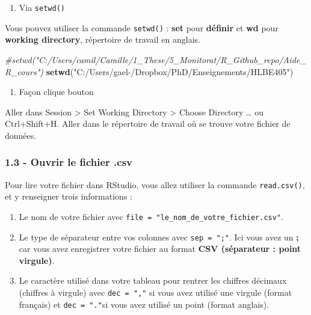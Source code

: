\documentclass[
]{article}
\newenvironment{Shaded}{\begin{snugshade}}{\end{snugshade}}
\newcommand{\CommentTok}[1]{\textcolor[rgb]{0.56,0.35,0.01}{\textit{#1}}}
\newcommand{\KeywordTok}[1]{\textcolor[rgb]{0.13,0.29,0.53}{\textbf{#1}}}
\newcommand{\NormalTok}[1]{#1}
\newcommand{\StringTok}[1]{\textcolor[rgb]{0.31,0.60,0.02}{#1}}
\providecommand{\tightlist}{%
  \setlength{\itemsep}{0pt}\setlength{\parskip}{0pt}}
\begin{document}
\begin{enumerate}
\def\labelenumi{\arabic{enumi}.}
\tightlist
\item
  Via \texttt{setwd()}
\end{enumerate}

Vous pouvez utiliser la commande \texttt{setwd()} : \textbf{set} pour
\textbf{définir} et \textbf{wd} pour \textbf{working directory},
répertoire de travail en anglais.

\begin{Shaded}
\begin{Highlighting}[]
\CommentTok{#setwd("C:/Users/camil/Camille/1_These/5_Monitorat/R_Github_repo/Aide_R_cours")}
\KeywordTok{setwd}\NormalTok{(}\StringTok{"C:/Users/gael-/Dropbox/PhD/Enseignements/HLBE405"}\NormalTok{)}
\end{Highlighting}
\end{Shaded}

\begin{enumerate}
\def\labelenumi{\arabic{enumi}.}
\setcounter{enumi}{1}
\tightlist
\item
  Façon clique bouton
\end{enumerate}

Aller dans Session \textgreater{} Set Working Directory \textgreater{}
Choose Directory \ldots{} ou Ctrl+Shift+H. Aller dans le répertoire de
travail où se trouve votre fichier de données.

\hypertarget{ouvrir-le-fichier-.csv}{%
\subsubsection{1.3 - Ouvrir le fichier
.csv}\label{ouvrir-le-fichier-.csv}}

Pour lire votre fichier dans RStudio, vous allez utiliser la commande
\texttt{read.csv()}, et y renseigner trois informations :

\begin{enumerate}
\def\labelenumi{\arabic{enumi}.}
\tightlist
\item
  Le nom de votre fichier avec
  \texttt{file\ =\ "le\_nom\_de\_votre\_fichier.csv"}.
\item
  Le type de séparateur entre vos colonnes avec \texttt{sep\ =\ ";"}.
  Ici vous avez un \textbf{;} car vous avez enregistrer votre fichier au
  format \textbf{CSV (séparateur : point virgule)}.
\item
  Le caractère utilisé dans votre tableau pour rentrer les chiffres
  décimaux (chiffres à virgule) avec \texttt{dec\ =\ ","} si vous avez
  utilisé une virgule (format français) et \texttt{dec\ =\ "."}si vous
  avez utilisé un point (format anglais).
\end{enumerate}
\end{document}
